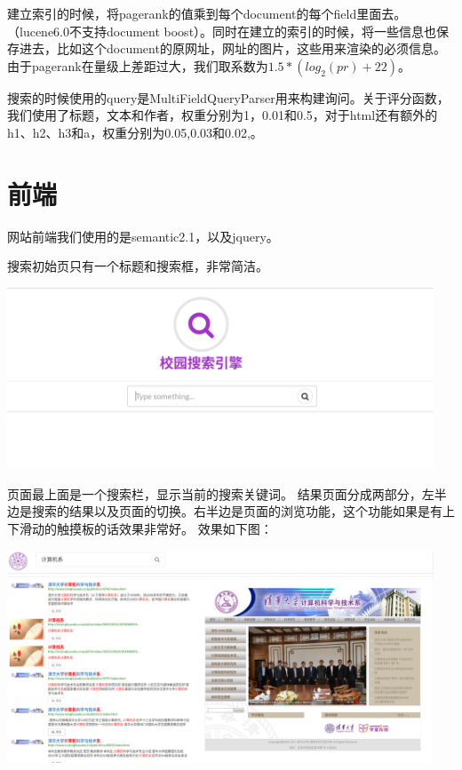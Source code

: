 \documentclass[11pt, a4paper]{article}
\begin{document}
建立索引的时候，将pagerank的值乘到每个document的每个field里面去。（lucene6.0不支持document boost）。同时在建立的索引的时候，将一些信息也保存进去，比如这个document的原网址，网址的图片，这些用来渲染的必须信息。由于pagerank在量级上差距过大，我们取系数为\(1.5*(log_2(pr)+22)\)。

搜索的时候使用的query是MultiFieldQueryParser用来构建询问。关于评分函数，我们使用了标题，文本和作者，权重分别为1，0.01和0.5，对于html还有额外的h1、h2、h3和a，权重分别为0.05,0.03和0.02,。

\section{前端}
网站前端我们使用的是semantic2.1，以及jquery。

搜索初始页只有一个标题和搜索框，非常简洁。

\begin{center}
    \includegraphics[width=5in]{index}
\end{center}

页面最上面是一个搜索栏，显示当前的搜索关键词。
结果页面分成两部分，左半边是搜索的结果以及页面的切换。右半边是页面的浏览功能，这个功能如果是有上下滑动的触摸板的话效果非常好。
效果如下图：

\begin{center}
    \includegraphics[width=5in]{result}
\end{center}
\end{document}
